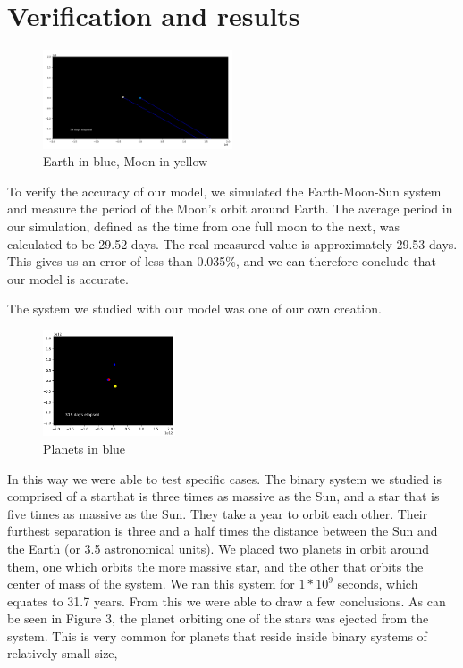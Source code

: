 \documentclass[12pt]{article}
\begin{document}
\section{Verification and results}
\begin{figure}
    \centering
    \includegraphics[width=0.5\textwidth]{sem}
    \caption{Earth in blue, Moon in yellow}
\end{figure}
To verify the accuracy of our model, we simulated the Earth-Moon-Sun system and measure the period of the Moon's orbit around Earth. The average period in our simulation, defined as the time from one full moon to the next, was calculated to be 29.52 days. The real measured value is approximately 29.53 days. This gives us an error of less than 0.035\%, and we can therefore conclude that our model is accurate.

The system we studied with our model was one of our own creation. 
\begin{figure} 
    \centering
    \includegraphics[width=0.35\textwidth]{binary1}
    \caption{Planets in blue}
\end{figure}
In this way we were able to test specific cases. The binary system we studied is comprised of a starthat is three times as massive as the Sun, and a star that is five times as massive as the Sun. They take a year to orbit each other. Their furthest separation is three and a half times the distance between the Sun and the Earth (or 3.5 astronomical units). We placed two planets in orbit around them, one which orbits the more massive star, and the other that orbits the center of mass of the system. We ran this system for $1*10^9$ seconds, which equates to 31.7 years. From this we were able to draw a few conclusions. As can be seen in Figure 3, the planet orbiting one of the stars was ejected from the system. This is very common for planets that reside inside binary systems of relatively small size, 
\end{document}
